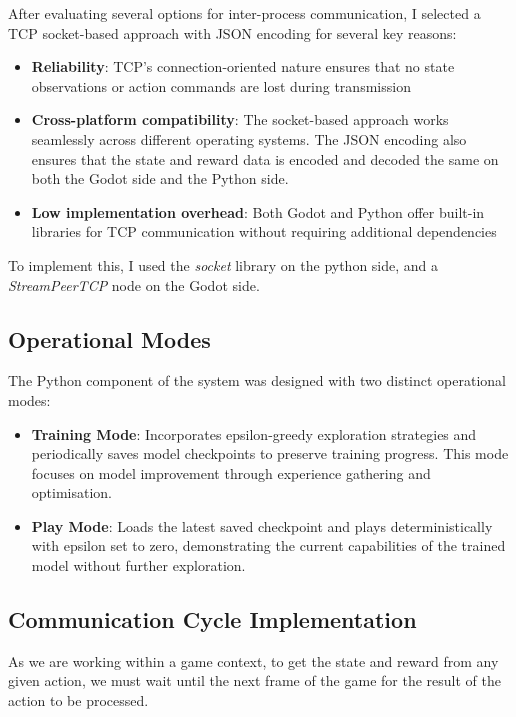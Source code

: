 After evaluating several options for inter-process communication, I selected a TCP socket-based approach with JSON encoding for several key reasons:

\begin{itemize}
    \item \textbf{Reliability}: TCP's connection-oriented nature ensures that no state observations or action commands are lost during transmission
    \item \textbf{Cross-platform compatibility}: The socket-based approach works seamlessly across different operating systems. The JSON encoding also ensures that the state and reward data is encoded and decoded the same on both the Godot side and the Python side.
    \item \textbf{Low implementation overhead}: Both Godot and Python offer built-in libraries for TCP communication without requiring additional dependencies
\end{itemize}

To implement this, I used the \textit{socket} library on the python side, and a \textit{StreamPeerTCP} node on the Godot side.

\subsection{Operational Modes}

The Python component of the system was designed with two distinct operational modes:

\begin{itemize}
    \item \textbf{Training Mode}: Incorporates epsilon-greedy exploration strategies and periodically saves model checkpoints to preserve training progress. This mode focuses on model improvement through experience gathering and optimisation.
    \item \textbf{Play Mode}: Loads the latest saved checkpoint and plays deterministically with epsilon set to zero, demonstrating the current capabilities of the trained model without further exploration.
\end{itemize}

\subsection{Communication Cycle Implementation}

As we are working within a game context, to get the state and reward from any given action, we must wait until the next frame of the game for the result of the action to be processed. 

